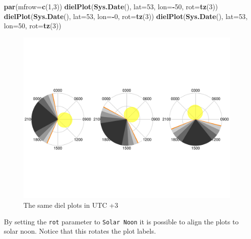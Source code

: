 \documentclass[
]{book}
\newenvironment{Shaded}{\begin{snugshade}}{\end{snugshade}}
\newcommand{\AttributeTok}[1]{\textcolor[rgb]{0.13,0.29,0.53}{#1}}
\newcommand{\DecValTok}[1]{\textcolor[rgb]{0.00,0.00,0.81}{#1}}
\newcommand{\FunctionTok}[1]{\textcolor[rgb]{0.13,0.29,0.53}{\textbf{#1}}}
\newcommand{\NormalTok}[1]{#1}
\newcommand{\SpecialCharTok}[1]{\textcolor[rgb]{0.81,0.36,0.00}{\textbf{#1}}}
\begin{document}
\begin{Shaded}
\begin{Highlighting}[]
\FunctionTok{par}\NormalTok{(}\AttributeTok{mfrow=}\FunctionTok{c}\NormalTok{(}\DecValTok{1}\NormalTok{,}\DecValTok{3}\NormalTok{))}
\FunctionTok{dielPlot}\NormalTok{(}\FunctionTok{Sys.Date}\NormalTok{(), }\AttributeTok{lat=}\DecValTok{53}\NormalTok{, }\AttributeTok{lon=}\SpecialCharTok{{-}}\DecValTok{50}\NormalTok{, }\AttributeTok{rot=}\FunctionTok{tz}\NormalTok{(}\DecValTok{3}\NormalTok{))}
\FunctionTok{dielPlot}\NormalTok{(}\FunctionTok{Sys.Date}\NormalTok{(), }\AttributeTok{lat=}\DecValTok{53}\NormalTok{, }\AttributeTok{lon=}\SpecialCharTok{{-}}\DecValTok{0}\NormalTok{, }\AttributeTok{rot=}\FunctionTok{tz}\NormalTok{(}\DecValTok{3}\NormalTok{))}
\FunctionTok{dielPlot}\NormalTok{(}\FunctionTok{Sys.Date}\NormalTok{(), }\AttributeTok{lat=}\DecValTok{53}\NormalTok{, }\AttributeTok{lon=}\DecValTok{50}\NormalTok{, }\AttributeTok{rot=}\FunctionTok{tz}\NormalTok{(}\DecValTok{3}\NormalTok{))}
\end{Highlighting}
\end{Shaded}

\begin{figure}

{\centering \includegraphics[width=0.9\linewidth]{_main_files/figure-latex/diel-plot-tz-1} 

}

\caption{The same diel plots in UTC +3}\label{fig:diel-plot-tz}
\end{figure}

By setting the \texttt{rot} parameter to \texttt{Solar\ Noon} it is possible to align the plots to solar noon. Notice that this rotates the plot labels.
\end{document}
